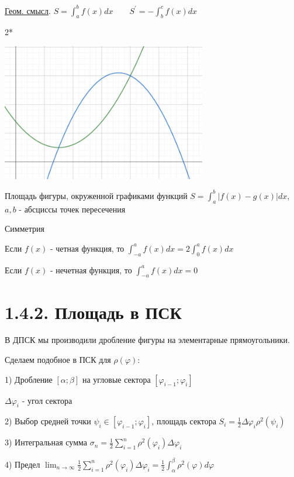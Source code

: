 \documentclass[12pt]{article}
\begin{document}
    \underline{Геом. смысл}. $S = \int_a^b f(x) dx \quad\quad S^\prime = -\int_b^c f(x)dx$

    \mediumvspace

    2*

    \begin{center}
        \includegraphics[height=6cm]{calculus/images/calculus_2024_02_14_3}
    \end{center}

    Площадь фигуры, окруженной графиками функций $S = \int_a^b |f(x) - g(x)| dx$, $a, b$ - абсциссы точек пересечения

    \Nota Симметрия

    Если $f(x)$ - четная функция, то $\int_{-a}^a f(x) dx = 2 \int_0^a f(x)dx$

    Если $f(x)$ - нечетная функция, то $\int_{-a}^a f(x) dx = 0$

    \section{1.4.2. Площадь в ПСК}

    \hypertarget{integralareapsk}{В ДПСК мы производили дробление фигуры на элементарные прямоугольники.} Сделаем подобное в ПСК для $\rho(\varphi)$:

    1) Дробление $[\alpha;\beta]$ на угловые сектора $[\varphi_{i - 1};\varphi_i]$

    $\Delta \varphi_i$ - угол сектора

    2) Выбор средней точки $\psi_i \in [\varphi_{i - 1};\varphi_i]$, площадь сектора $S_i = \frac{1}{2} \Delta \varphi_i \rho^2(\psi_i)$

    3) Интегральная сумма $\sigma_n = \frac{1}{2} \sum_{i=1}^n \rho^2 (\varphi_i) \Delta \varphi_i$

    4) Предел $\lim_{n \to \infty} \frac{1}{2} \sum_{i=1}^n \rho^2 (\varphi_i) \Delta \varphi_i = \frac{1}{2} \int_\alpha^\beta \rho^2(\varphi) d\varphi$
\end{document}
